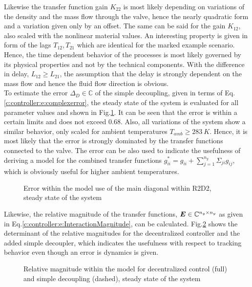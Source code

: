 Likewise the transfer function gain $K_{22}$ is most likely depending on variations of the density and the mass flow through the valve, hence the nearly quadratic form and a variation given only by an offset. The same can be said for the gain $K_{12}$, also scaled with the nonlinear material values. An interesting property is given in form of the lags $T_{12},T_{21}$ which are identical for the marked example scenario. Hence, the time dependent behavior of the processes is most likely governed by its physical properties and not by the technical components. With the difference in delay, $L_{12} \geq L_{21}$, the assumption that the delay is strongly dependent on the mass flow and hence the fluid flow direction is obvious.\\

To estimate the error $\Delta_D \in \mathbb{C}$ of the simple decoupling, given in terms of Eq.\ref{c:controller:e:complexerror}, the steady state of the system is evaluated for all parameter values and shown in Fig.\ref{c:physical:f:complex_error}. It can be seen that the error is within a certain limits and does not exceed $0.68$. Also, all variations of the system show a similar behavior, only scaled for ambient temperatures $T_{amb}\geq 283 ~K$. Hence, it is most likely that the error is strongly dominated by the transfer functions connected to the valve. The error can be also used to indicate the usefulness of deriving a model for the combined transfer functions $g_{ii}^* = g_{ii}+ \sum_{j=1}^{n_y} \Sigma_{ji}g_{ij}$, which is obviously useful for higher ambient temperatures.

\begin{figure}[H]

\caption{Error within the model use of the main diagonal within R2D2, steady state of the system}
\label{c:physical:f:complex_error}
\end{figure}

Likewise, the relative magnitude of the transfer functions, $\mbox{\boldmath$E$} \in \mathbb{C}^{n_y \times n_y}$ as given in Eq.\ref{c:controller:e:InteractionMagnitude}, can be calculated. Fig.\ref{c:physical:f:relative_mag} shows the determinant of the relative magnitudes for the decentralized controller and the added simple decoupler, which indicates the usefulness with respect to tracking behavior even though an error is dynamics is given.

\begin{figure}[H]

\caption{Relative magnitude within the model for decentralized control (full) and simple decoupling (dashed), steady state of the system}
\label{c:physical:f:relative_mag}
\end{figure}


